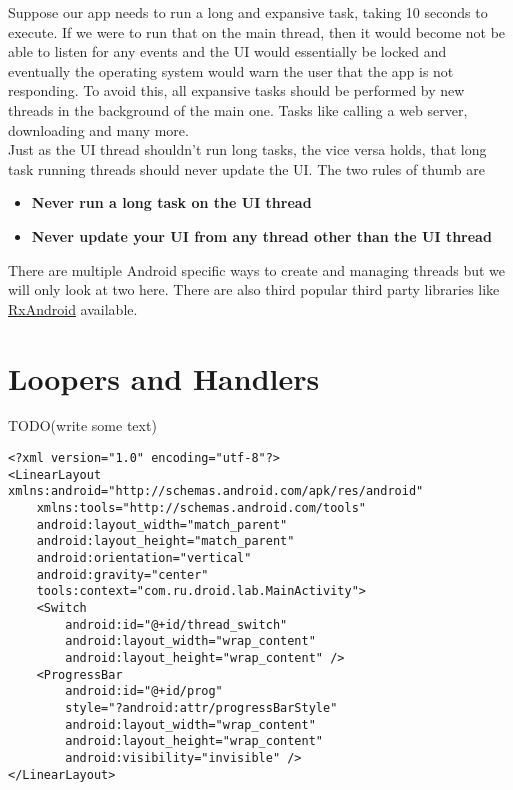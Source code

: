 Suppose our app needs to run a long and expansive task, taking 10 seconds to execute. If we were to run that on the main thread, then it would become not be able to listen for any events and the UI would essentially be locked and eventually the operating system would warn the user that the app is not responding. To avoid this, all expansive tasks should be performed by new threads in the background of the main one. Tasks like calling a web server, downloading and many more.\\

Just as the UI thread shouldn't run long tasks, the vice versa holds, that long task running threads should never update the UI. The two rules of thumb are
\begin{itemize}
\item \textbf{Never run a long task on the UI thread}
\item \textbf{Never update your UI from any thread other than the UI thread}
\end{itemize}

There are multiple Android specific ways to create and managing threads but we will only look at two here. There are also third popular third party libraries like \href{https://github.com/ReactiveX/RxAndroid}{RxAndroid} available.

\section{Loopers and Handlers}
{\Huge TODO(write some text)}

\begin{lstlisting}[style=A_XML,caption={Layout for handler program},label={listing:switchlayout}]
<?xml version="1.0" encoding="utf-8"?>
<LinearLayout xmlns:android="http://schemas.android.com/apk/res/android"
    xmlns:tools="http://schemas.android.com/tools"
    android:layout_width="match_parent"
    android:layout_height="match_parent"
    android:orientation="vertical"
    android:gravity="center"
    tools:context="com.ru.droid.lab.MainActivity">
    <Switch
        android:id="@+id/thread_switch"
        android:layout_width="wrap_content"
        android:layout_height="wrap_content" />
    <ProgressBar
        android:id="@+id/prog"
        style="?android:attr/progressBarStyle"
        android:layout_width="wrap_content"
        android:layout_height="wrap_content"
        android:visibility="invisible" />
</LinearLayout>
\end{lstlisting}

